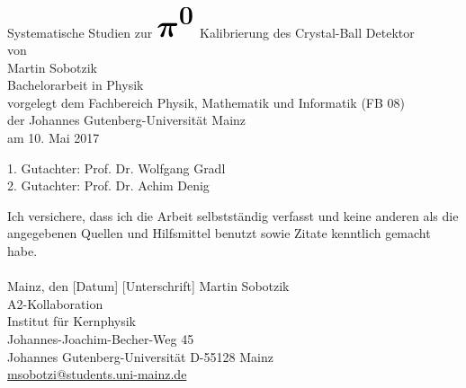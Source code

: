 \documentclass[a4paper,11pt,oneside,final,german,openbib,pdftex]{scrbook}
\begin{document}

\begin{titlepage}
  \vspace*{6mm}
  \begin{center}
     {\afont Systematische Studien zur 
     	$
     	\mathlarger{\mathlarger{\mathlarger{\mathlarger{\mathlarger{\mathlarger{\boldsymbol{
     										\pi^0
     									}}}}}}}
     	$ 
     	Kalibrierung des Crystal-Ball Detektor}
     \\[3.5cm]
     {\large von}
     \\[3.5cm]
     {\dfont Martin Sobotzik}
     \\[2cm]
     {\large Bachelorarbeit in Physik \\
        vorgelegt dem Fachbereich Physik, Mathematik und Informatik (FB 08) \/\\
        der Johannes Gutenberg-Universit\"at Mainz \/\\
        am 10. Mai 2017}
   \end{center}
   \vfill
   1. Gutachter: Prof. Dr. Wolfgang Gradl\\	
   2. Gutachter: Prof. Dr. Achim Denig \\
   \vfill
\end{titlepage}

\thispagestyle{empty}
Ich versichere, dass ich die Arbeit selbstst\"andig verfasst und keine 
anderen als die angegebenen Quellen und Hilfsmittel benutzt sowie 
Zitate kenntlich gemacht habe.
\\
\\[3.5cm] 
Mainz, den [Datum] [Unterschrift]
\vfill
\noindent 
Martin Sobotzik\\
A2-Kollaboration\\
Institut f\"ur Kernphysik\\
Johannes-Joachim-Becher-Weg 45\\
Johannes Gutenberg-Universit\"at
D-55128 Mainz\\
{\url{ msobotzi@students.uni-mainz.de}}



\renewcommand\contentsname{Inhaltsverzeichnis}
\renewcommand\figurename{Abbildung}
\renewcommand\tablename{Tabelle}
\tableofcontents
\clearpage
\end{document}
